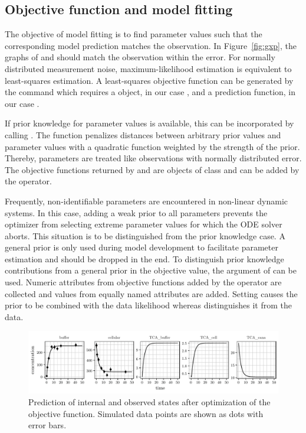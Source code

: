 \documentclass[article]{jss}
\begin{document}
\subsection{Objective function and model fitting}
The objective of model fitting is to find parameter values such that the corresponding model prediction matches the observation. In Figure~\ref{fig:gxp}, the graphs of  and  should match the observation within the error.
For normally distributed measurement noise, maxi\-mum-likelihood estimation is equivalent to least-squares estimation. A least-squares objective function can be generated by the  command which requires a  object, in our case , and a prediction function, in our case .

If prior knowledge for parameter values is available, this can be incorporated by calling . The function penalizes distances between arbitrary prior values and parameter values with a quadratic function weighted by the strength of the prior. Thereby, parameters are treated like observations with normally distributed error. The objective functions returned by  and  are objects of class  and can be added by the  operator.

Frequently, non-identifiable parameters are encountered in non-linear dynamic systems. In this case, adding a weak prior to all parameters prevents the optimizer from selecting extreme parameter values for which the ODE solver aborts. This situation is to be distinguished from the prior knowledge case. A general prior is only used during model development to facilitate parameter estimation and should be dropped in the end. To distinguish prior knowledge contributions from a general prior in the objective value, the  argument of  can be used. Numeric attributes from objective functions added by the  operator are collected and values from equally named attributes are added. Setting  causes the prior to be combined with the data likelihood whereas  distinguishes it from the data. 

\begin{figure}[t!]
\centering
\includegraphics[width = \textwidth]{Figures/figure4}
\caption{Prediction of internal and observed states after optimization of the objective function. Simulated data points are shown as dots with error bars.}
\label{fig:myfit}
\end{figure}
\end{document}
